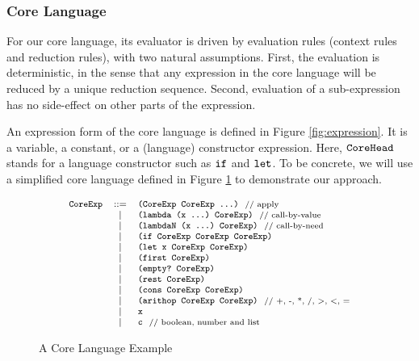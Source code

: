 \subsubsection{Core Language}

For our core language,  its evaluator is driven by evaluation rules (context rules and reduction rules), with two natural assumptions. First, the evaluation is deterministic, in the sense that any expression in the core language will be reduced by a unique reduction sequence. Second, evaluation of a sub-expression has no side-effect on other parts of the expression.

An expression form of the core language is defined in Figure \ref{fig:expression}. It is a variable, a constant, or a (language) constructor expression. Here, $\mbox{\tt CoreHead}$ stands for a language constructor such as $\mbox{\tt if}$ and $\mbox{\tt let}$. To be concrete, we will use a simplified core language defined in Figure \ref{fig:core} to demonstrate our approach.

\begin{figure}[thb]
\begin{centering}
	\[
	{\footnotesize
			\begin{array}{lcl}
			\mbox{\tt CoreExp} &::=& \texttt{(CoreExp~CoreExp~...)} ~~\mbox{{\scriptsize // apply}}\\
			&|& \mbox{\tt (lambda~(x~...)~CoreExp)} ~~\mbox{{\scriptsize // call-by-value}}\\
			&|& \mbox{\tt (lambdaN~(x~...)~CoreExp)} ~~\mbox{{\scriptsize // call-by-need}}\\
			&|& \mbox{\tt (if~CoreExp~CoreExp~CoreExp)}\\
			&|& \mbox{\tt (let~x~CoreExp~CoreExp)}\\
			&|& \mbox{\tt (first~CoreExp)}\\
			&|& \mbox{\tt (empty?~CoreExp)}\\
			&|& \mbox{\tt (rest~CoreExp)}\\
			&|& \mbox{\tt (cons~CoreExp~CoreExp)}\\
			&|& \mbox{\tt (arithop~CoreExp~CoreExp)} ~~\mbox{{\scriptsize // +, -, *, /, >, <, =}}\\
			&|& \mbox{\tt x}\\
			&|& \mbox{\tt c} ~~\mbox{{\scriptsize // boolean, number and list}}
			\end{array}
	}
	\]
\end{centering}
\caption{A Core Language Example}
\label{fig:core}
\end{figure}




